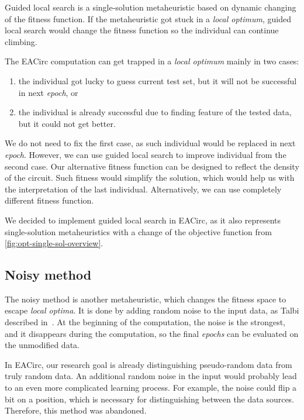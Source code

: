 \documentclass[
  print, %
  Table,   %
  nolof,     %
  nolot,     %
  11pt, %
  oneside  %
]{fithesis3}
\begin{document}
Guided local search is a single-solution metaheuristic based on dynamic changing of the fitness function. If the metaheuristic got stuck in a \textit{local optimum}, guided local search would change the fitness function so the individual can continue climbing.

The EACirc computation can get trapped in a \textit{local optimum} mainly in two cases:

\begin{enumerate}[noitemsep,topsep=3pt,parsep=3pt,partopsep=3pt]
    \item the individual got lucky to guess current test set, but it will not be successful in next \textit{epoch}, or
    \item the individual is already successful due to finding feature of the tested data, but it could not get better.
\end{enumerate}

We do not need to fix the first case, as such individual would be replaced in next \textit{epoch}. However, we can use guided local search to improve individual from the second case. Our alternative fitness function can be designed to reflect the density of the circuit. Such fitness would simplify the solution, which would help us with the interpretation of the last individual. Alternatively, we can use completely different fitness function.

We decided to implement guided local search in EACirc, as it also represents single-solution metaheuristics with a change of the objective function from \cref{fig:opt-single-sol-overview}.

\subsection{Noisy method}
\label{subsec:opt-single-sol-nois}

The noisy method is another metaheuristic, which changes the fitness space to escape \textit{local optima}. It is done by adding random noise to the input data, as Talbi described in~\cite[Section 2.9.2]{talbi2009metaheuristics}. At the beginning of the computation, the noise is the strongest, and it disappears during the computation, so the final \textit{epochs} can be evaluated on the unmodified data.

In EACirc, our research goal is already distinguishing pseudo-random data from truly random data. An additional random noise in the input would probably lead to an even more complicated learning process. For example, the noise could flip a bit on a position, which is necessary for distinguishing between the data sources. Therefore, this method was abandoned.
\end{document}
